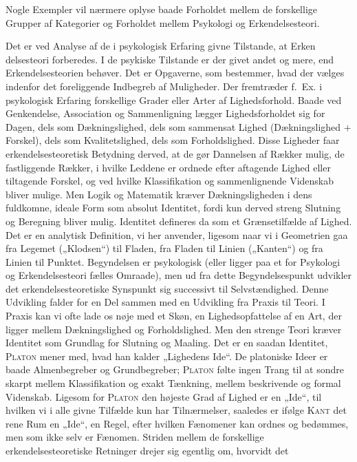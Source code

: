 \documentclass[12pt]{article}
\newcommand{\opage}[1]{\marginnote{\footnotesize\textit{[#1]}}}
\begin{document}
Nogle Exempler vil nærmere oplyse baade Forholdet mellem de forskellige Grupper
af Kategorier og Forholdet mellem Psykologi og Erkendelsesteori.

Det er ved Analyse af de i psykologisk Erfaring givne Tilstande, at Erken%
\opage{16}delsesteori forberedes. I de psykiske Tilstande er der givet andet og
mere, end Erkendelsesteorien behøver. Det er Opgaverne, som bestemmer, hvad der
vælges indenfor det foreliggende Indbegreb af Muligheder. Der fremtræder
f.~Ex. i psykologisk Erfaring forskellige Grader eller Arter af Lighedsforhold.
Baade ved Genkendelse, Association og Sammenligning lægger Lighedsforholdet sig
for Dagen, dels som Dækningslighed, dels som sammensat Lighed (Dækningslighed
$+$ Forskel), dels som Kvalitetslighed, dels som Forholdslighed. Disse Ligheder
faar erkendelsesteoretisk Betydning derved, at de gør Dannelsen af Rækker mulig,
de fastliggende Rækker, i hvilke Leddene er ordnede efter aftagende Lighed eller
tiltagende Forskel, og ved hvilke Klassifikation og sammenlignende Videnskab
bliver mulige. Men Logik og Matematik kræver Dækningsligheden i dens fuldkomne,
ideale Form som absolut Identitet, fordi kun derved streng Slutning og Beregning
bliver mulig. Identitet defineres da som et Grænsetilfælde af Lighed. Det er en
analytisk Definition, vi her anvender, ligesom naar vi i Geometrien gaa fra
Legemet („Klodsen“) til Fladen, fra Fladen til Linien („Kanten“) og fra Linien
til Punktet. Begyndelsen er psykologisk (eller ligger paa et for Psykologi og
Erkendelsesteori fælles Omraade), men ud fra dette Begyndelsespunkt udvikler det
erkendelsesteoretiske Synspunkt sig successivt til Selvstændighed. Denne
Udvikling falder for en Del sammen med en Udvikling fra Praxis til Teori. I
Praxis kan vi ofte lade os nøje med et Skøn, en Lighedsopfattelse af en Art, der
ligger mellem Dækningslighed og Forholdslighed. Men den strenge Teori kræver
Identitet som Grundlag for Slutning og Maaling. Det er en saadan Identitet,
\textsc{Platon} mener med, hvad han kalder „Lighedens Ide“. De platoniske Ideer
er baade Almenbegreber og Grundbegreber; \textsc{Platon} følte ingen Trang til
at sondre skarpt mellem Klassifikation og exakt Tænkning, mellem beskrivende og
formal Videnskab. Ligesom for \textsc{Platon} den højeste Grad af Lighed er en
„Ide“, til hvilken vi i alle givne Tilfælde kun har Tilnærmelser, saaledes er
ifølge \textsc{Kant} det rene Rum en „Ide“, en Regel, efter hvilken Fænomener
kan ordnes og bedømmes, men som ikke selv er Fænomen. Striden mellem de
forskellige erkendelsesteoretiske Retninger drejer sig egentlig om, hvorvidt det
\end{document}
